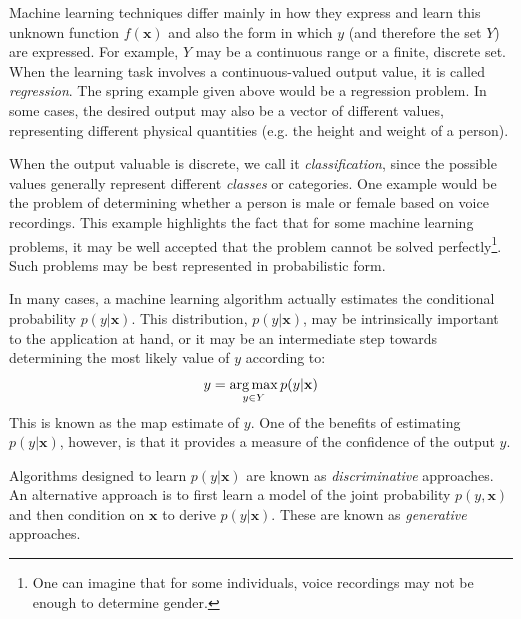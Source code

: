 Machine learning techniques differ mainly in how they express and learn this unknown function $f(\mathbf{x})$ and also the form in which $y$ (and therefore the set $Y$) are expressed. For example, $Y$ may be a continuous range or a finite, discrete set. When the learning task involves a continuous-valued output value, it is called \emph{regression}. The spring example given above would be a regression problem. In some cases, the desired output may also be a vector of different values, representing different physical quantities (e.g. the height and weight of a person).

When the output valuable is discrete, we call it \emph{classification}, since the possible values generally represent different \emph{classes} or categories. One example would be the problem of determining whether a person is male or female based on voice recordings. This example highlights the fact that for some machine learning problems, it may be well accepted that the problem cannot be solved perfectly\footnote{One can imagine that for some individuals, voice recordings may not be enough to determine gender.}. Such problems may be best represented in probabilistic form.

In many cases, a machine learning algorithm actually estimates the conditional probability $p(y|\mathbf{x})$. This distribution, $p(y|\mathbf{x})$, may be intrinsically important to the application at hand, or it may be an intermediate step towards determining the most likely value of $y$ according to:
%
\begin{equation}
y = \operatorname*{arg\,max}_{y \in Y} p (y|\mathbf{x})
\end{equation}
%
This is known as the \gls{map} estimate of $y$. One of the benefits of estimating $p(y|\mathbf{x})$, however, is that it provides a measure of the confidence of the output $y$.

Algorithms designed to learn $p(y|\mathbf{x})$ are known as \emph{discriminative} approaches. An alternative approach is to first learn a model of the joint probability $p(y,\mathbf{x})$ and then condition on $\mathbf{x}$ to derive $p(y|\mathbf{x})$. These are known as \emph{generative} approaches.



